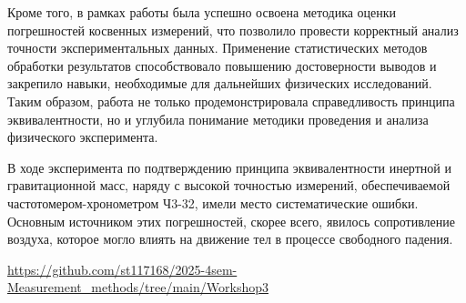 Кроме того, в рамках работы была успешно освоена методика оценки погрешностей косвенных измерений, что позволило провести корректный анализ точности экспериментальных данных. Применение статистических методов обработки результатов способствовало повышению достоверности выводов и закрепило навыки, необходимые для дальнейших физических исследований. Таким образом, работа не только продемонстрировала справедливость принципа эквивалентности, но и углубила понимание методики проведения и анализа физического эксперимента.

В ходе эксперимента по подтверждению принципа эквивалентности инертной и гравитационной масс, наряду с высокой точностью измерений, обеспечиваемой частотомером-хронометром Ч3-32, имели место систематические ошибки. Основным источником этих погрешностей, скорее всего, явилось сопротивление воздуха, которое могло влиять на движение тел в процессе свободного падения. 

\begin{thebibliography}{9}

\url{https://github.com/st117168/2025-4sem-Measurement_methods/tree/main/Workshop3} 

\end{thebibliography}


